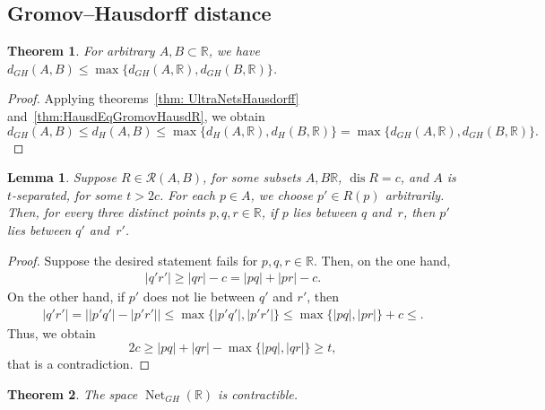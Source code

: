 \documentclass{article}
\newtheorem{lemma}{Lemma}[]
\newtheorem{theorem}{Theorem}[]
\theoremstyle{definition}
\theoremstyle{plain}
\newcommand{\dis}{\operatorname{dis}}
\renewcommand{\:}{\colon}
\newcommand{\0}{\emptyset}
\renewcommand{\(}{\rom(}
\renewcommand{\)}{\rom)}
\renewcommand{\ss}{\subset}
\newcommand{\R}{\mathbb{R}}
\newcommand{\nets}{\operatorname{Net}}
\begin{document}
\subsection{Gromov--Hausdorff distance}

\begin{theorem}\label{thm: UltraNetsGromovHausdorff}
For arbitrary $A,B\ss \R$, we have $d_{GH}(A, B)\le \max\big\{d_{GH}(A, \R), d_{GH}(B, \R)\big\}$.
\end{theorem}
\begin{proof}
Applying theorems~\ref{thm: UltraNetsHausdorff} and~\ref{thm:HausdEqGromovHausdR}, we obtain
$$d_{GH}(A, B)\le d_H(A, B)\le \max\big\{d_H(A, \R), d_H(B, \R)\big\} = \max\big\{d_{GH}(A, \R), d_{GH}(B, \R)\big\}.$$
\end{proof}

\begin{lemma}\label{lemma: transfer_separated}
Suppose $R\in\mathcal{R}(A, B)$, for some subsets $A,B\R$, $\dis R = c$, and $A$ is $t$-separated, for some $t > 2c$. For each $p\in A$, we choose $p'\in R(p)$ arbitrarily. Then, for every three distinct points $p, q, r\in \R$, if $p$ lies between $q$ and~$r$, then $p'$ lies between $q'$ and~$r'$.
\end{lemma}

\begin{proof}
Suppose the desired statement fails for $p,q,r\in \R$. Then, on the one hand, 
\begin{align*}
|q'r'|\ge |qr| - c = |pq| + |pr| - c.
\end{align*}
On the other hand, if $p'$ does not lie between $q'$ and $r'$, then
\begin{align*}
|q'r'| = \bigl||p'q'| - |p'r'|\bigr|\le\max\bigl\{|p'q'| , |p'r'|\bigr\}\le \max\{|pq|, |pr|\} + c \le .
\end{align*}
Thus, we obtain $$2c\ge |pq| + |qr| - \max\bigl\{|pq|, |qr|\bigr\}\ge t, $$ that is a contradiction.
\end{proof}

\begin{theorem}
The space $\nets_{GH}(\R)$ is contractible.
\end{theorem}
\end{document}
